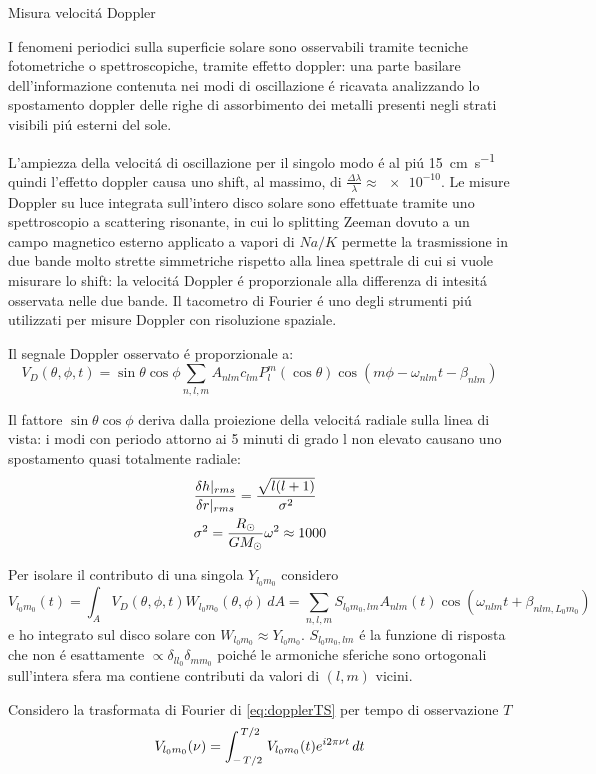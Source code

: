 \begin{frame}{Misura velocit\'a Doppler}

I fenomeni periodici sulla superficie solare sono osservabili tramite tecniche fotometriche o spettroscopiche, tramite effetto doppler: una parte basilare dell'informazione contenuta nei modi di oscillazione \'e ricavata analizzando  lo spostamento doppler delle righe di assorbimento dei metalli presenti negli strati visibili pi\'u esterni del sole.

L'ampiezza della velocit\'a di oscillazione per il singolo modo \'e  al pi\'u \SI{15}{\cm\per\second} quindi l'effetto doppler causa uno shift, al massimo, di $\frac{\Delta\lambda}{\lambda}\approx\num{e-10}$. Le misure Doppler su luce integrata sull'intero disco solare sono effettuate tramite uno spettroscopio a scattering risonante, in cui lo splitting  Zeeman dovuto a un campo magnetico esterno applicato a vapori di $Na/K$ permette la trasmissione  in due bande molto strette simmetriche rispetto alla linea spettrale di cui si vuole misurare lo shift: la velocit\'a Doppler \'e proporzionale alla differenza di intesit\'a osservata nelle due bande. Il tacometro di Fourier \'e uno degli strumenti pi\'u utilizzati per misure Doppler  con risoluzione spaziale.

Il segnale Doppler osservato \'e proporzionale a:
\begin{equation}
    V_D(\theta,\phi,t)=\sin{\theta}\cos{\phi}\sum_{n,l,m}A_{nlm}c_{lm}P_l^m(\cos{\theta})\cos{(m\phi-\omega_{nlm}t-\beta_{nlm})}
\end{equation}

Il fattore $\sin{\theta}\cos{\phi}$ deriva dalla proiezione della velocit\'a radiale sulla linea di vista: i modi con periodo attorno ai 5 minuti di grado l non elevato causano uno spostamento quasi totalmente radiale:
\begin{align}
&\frac{\delta h|_{rms}}{\delta r|_{rms}}=\frac{\sqrt{l(l+1)}}{\sigma^2}\\
&\sigma^2=\frac{R_{\odot}{}}{GM_{\odot}{}}\omega^2\approx1000
\end{align}

Per isolare il contributo di una singola $Y_{l_0m_0}$ considero
\begin{equation}\label{eq:dopplerTS}
V_{l_0m_0}(t)=\int_AV_D(\theta,\phi,t)W_{l_0m_0}(\theta,\phi)\,dA=\sum_{n,l,m}S_{l_0m_0,lm}A_{nlm}(t)\cos{(\omega_{nlm}t+\beta_{nlm,L_0m_0})}
\end{equation}
e ho integrato sul disco solare con $W_{l_0m_0}\approx Y_{l_0m_0}$. $S_{l_0m_0,lm}$ \'e la funzione di risposta che non \'e esattamente $\propto\delta_{ll_0}\delta_{mm_0}$ poich\'e le armoniche sferiche sono ortogonali sull'intera sfera ma contiene contributi da valori di $(l,m)$ vicini.

Considero la trasformata di Fourier di \eqref{eq:dopplerTS} per tempo di osservazione $T$
\begin{equation}
V_{l_0m_0}(\nu)=\int_{-\left.{T}\middle/{2}\right.}^{\left.{T}\middle/{2}\right.}V_{l_0m_0}(t)e^{i2\pi\nu t}\,dt
\end{equation}

\end{frame}

